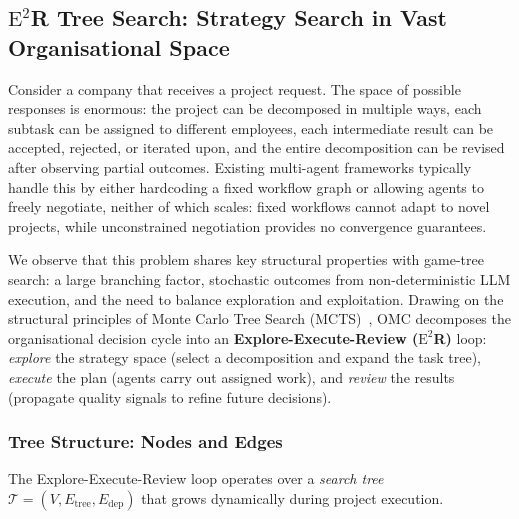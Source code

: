 \documentclass[11pt,a4paper]{article}
\begin{document}
\subsection{$\text{E}^2$R Tree Search: Strategy Search in Vast Organisational Space}
\label{sec:explore-review}

Consider a company that receives a project request. The space of possible responses is enormous: the project can be decomposed in multiple ways, each subtask can be assigned to different employees, each intermediate result can be accepted, rejected, or iterated upon, and the entire decomposition can be revised after observing partial outcomes. Existing multi-agent frameworks typically handle this by either hardcoding a fixed workflow graph or allowing agents to freely negotiate, neither of which scales: fixed workflows cannot adapt to novel projects, while unconstrained negotiation provides no convergence guarantees.

We observe that this problem shares key structural properties with game-tree search: a large branching factor, stochastic outcomes from non-deterministic LLM execution, and the need to balance exploration and exploitation. Drawing on the structural principles of Monte Carlo Tree Search (MCTS)~\cite{kocsis2006bandit}, OMC decomposes the organisational decision cycle into an \textbf{Explore-Execute-Review ($\text{E}^2$R)} loop: \emph{explore} the strategy space (select a decomposition and expand the task tree), \emph{execute} the plan (agents carry out assigned work), and \emph{review} the results (propagate quality signals to refine future decisions).

\subsubsection{Tree Structure: Nodes and Edges}

The Explore-Execute-Review loop operates over a \emph{search tree} $\mathcal{T} = (V, E_{\text{tree}}, E_{\text{dep}})$ that grows dynamically during project execution.
\end{document}
